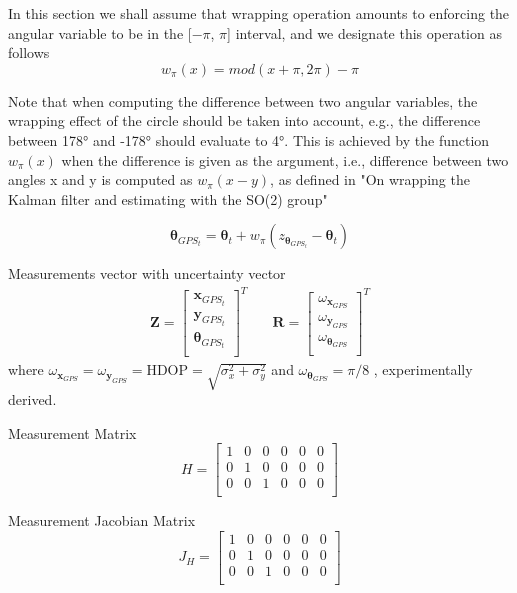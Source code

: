 In this section we shall assume that wrapping operation
amounts to enforcing the angular variable to be in the [$-\pi$, $\pi$]
interval, and we designate this operation as follows
\begin{equation}
w_{\pi}(x) = mod(x + \pi, 2\pi) - \pi
\end{equation}

Note that when computing the difference between two angular
variables, the wrapping effect of the circle should be taken into
account, e.g., the difference between 178° and -178° should
evaluate to 4°. This is achieved by the function $w_{\pi}(x)$ when the difference
is given as the argument, i.e., difference between two angles
x and y is computed as $w_{\pi}(x-y)$, as defined in "On wrapping the Kalman filter and estimating with
the SO(2) group"

$$
\boldsymbol \theta_{GPS_t} = \boldsymbol \theta_{t} + w_{\pi}(z_{\boldsymbol \theta_{GPS_t}} - \boldsymbol \theta_{t})
$$

Measurements vector with uncertainty vector
\begin{align}
\mathbf{Z}
=
\begin{bmatrix} 
\mathbf{x}_{GPS_t} \\ 
\mathbf{y}_{GPS_t} \\ 
\boldsymbol \theta_{GPS_t} \\ 
\end{bmatrix}^T
& \quad
\mathbf{R}
=
\begin{bmatrix} 
\omega_{\mathbf{x}_{GPS}} \\ 
\omega_{\mathbf{y}_{GPS}} \\ 
\omega_{\boldsymbol \theta_{GPS}} \\ 
\end{bmatrix}^T
\end{align}
where $ \omega_{\mathbf{x}_{GPS}} = \omega_{\mathbf{y}_{GPS}} = \text{HDOP} = \sqrt{\sigma_x^2 + \sigma_y^2}$ and 
$ \omega_{\boldsymbol \theta_{GPS}} = \pi/8 $ , experimentally derived.

Measurement Matrix
\begin{equation}
H
=
\begin{bmatrix} 
1 & 0 & 0 & 0 & 0 & 0 \\ 
0 & 1 & 0 & 0 & 0 & 0 \\ 
0 & 0 & 1 & 0 & 0 & 0 \\ 
\end{bmatrix}
\end{equation}

Measurement Jacobian Matrix
\begin{equation}
J_H
=
\begin{bmatrix} 
1 & 0 & 0 & 0 & 0 & 0 \\ 
0 & 1 & 0 & 0 & 0 & 0 \\ 
0 & 0 & 1 & 0 & 0 & 0 \\ 
\end{bmatrix}
\end{equation}



